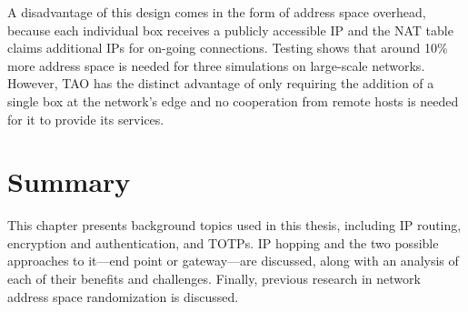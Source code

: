\par A disadvantage of this design comes in the form of address space overhead, because each individual box receives a publicly accessible \ac{IP} and the \ac{NAT} table claims additional \acp{IP} for on-going connections. Testing shows that around 10\% more address space is needed for three simulations on large-scale networks. However, \ac{TAO} has the distinct advantage of only requiring the addition of a single box at the network's edge and no cooperation from remote hosts is needed for it to provide its services.

\section{Summary}
\label{sec:background_summary}
\par This chapter presents background topics used in this thesis, including \ac{IP} routing, encryption and authentication, and \aclp{TOTP}. \ac{IP} hopping and the two possible approaches to it---end point or gateway---are discussed, along with an analysis of each of their benefits and challenges. Finally, previous research in network address space randomization is discussed.

